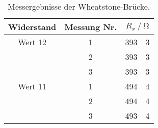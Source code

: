     \begin{table}
        \centering
        \caption{Messergebnisse der Wheatstone-Brücke.}
        \label{tab:resultwheat}
        \begin{tabular}{c c S[table-format=3.0] @{${}\pm{}$} S[table-format=1.0]}
            \toprule
            {Widerstand} & {Messung Nr.} &  \\
            \midrule
            Wert 12 & 1 & 393 & 3 \\
                    & 2 & 393 & 3 \\
                    & 3 & 393 & 3 \\
            Wert 11 & 1 & 494 & 4 \\
                    & 2 & 494 & 4 \\
                    & 3 & 493 & 4 \\
            \bottomrule
        \end{tabular}
    \end{table}
 
